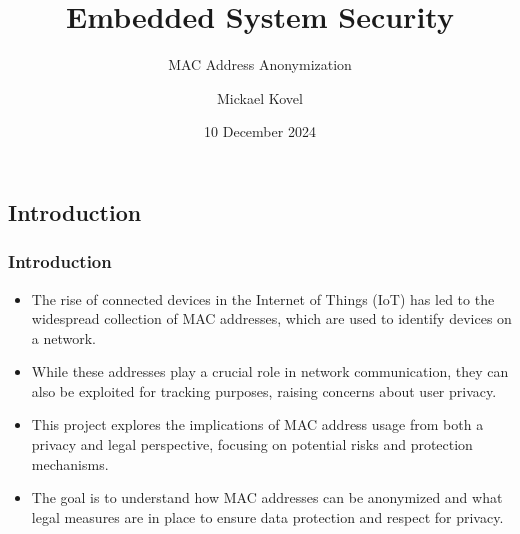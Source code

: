 \documentclass[
english,
svgnames,
notes=hide,
12pt]{beamer}
\date{10 December 2024}
\author[Mickael Kovel]{Mickael Kovel}
\title[ELEC-H-550]{Embedded System Security} %
\subtitle{MAC Address Anonymization} %
\institute[ULB]{Université Libre de Bruxelles \\ \smallskip \textit{}} %
\begin{document}
\begin{frame}
	\titlepage %
\end{frame}






\begin{frame}
  \section{Introduction}
  \frametitle{Introduction}
  \begin{itemize}
    \item The rise of connected devices in the Internet of Things (IoT) has led to the widespread collection of MAC addresses, which are used to identify devices on a network. \pause 
    \item While these addresses play a crucial role in network communication, they can also be exploited for tracking purposes, raising concerns about user privacy. \pause 
    \item This project explores the implications of MAC address usage from both a privacy and legal perspective, focusing on potential risks and protection mechanisms. \pause
    \item The goal is to understand how MAC addresses can be anonymized and what legal measures are in place to ensure data protection and respect for privacy.
  \end{itemize}
\end{frame}
\end{document}
